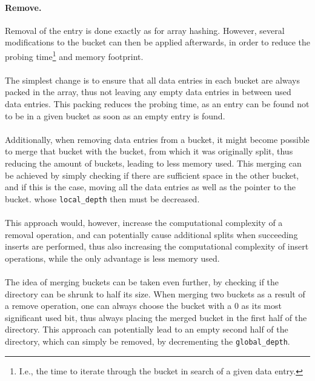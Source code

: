 \documentclass[11pt]{report} %
\begin{document}
\paragraph{Remove.} Removal of the entry is done exactly as for array hashing. However, several modifications to the bucket can then be applied afterwards, in order to reduce the probing time\footnote{I.e., the time to iterate through the bucket in search of a given data entry.} and memory footprint.\\
\\
The simplest change is to ensure that all data entries in each bucket are always packed in the array, thus not leaving any empty data entries in between used data entries. This packing reduces the probing time, as an entry can be found not to be in a given bucket as soon as an empty entry is found. \\
\\
Additionally, when removing data entries from a bucket, it might become possible to merge that bucket with the bucket, from which it was originally split, thus reducing the amount of buckets, leading to less memory used. This merging can be achieved by simply checking if there are sufficient space in the other bucket, and if this is the case, moving all the data entries as well as the pointer to the bucket. whose \verb|local_depth| then must be decreased. \\
\\
This approach would, however, increase the computational complexity of a removal operation, and can potentially cause additional splits when succeeding inserts are performed, thus also increasing the computational complexity of insert operations, while the only advantage is less memory used. \\
\\
The idea of merging buckets can be taken even further, by checking if the directory can be shrunk to half its size. When merging two buckets as a result of a remove operation, one can always choose the bucket with a 0 as its most significant used bit, thus always placing the merged bucket in the first half of the directory. This approach can potentially lead to an empty second half of the directory, which can simply be removed, by decrementing the \verb|global_depth|. 
\end{document}
